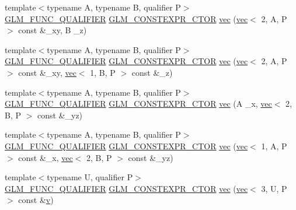 \begin{DoxyCompactItemize}
\item 
{\footnotesize template$<$typename A, typename B, qualifier P$>$ }\\\mbox{\hyperlink{setup_8hpp_a33fdea6f91c5f834105f7415e2a64407}{G\+L\+M\+\_\+\+F\+U\+N\+C\+\_\+\+Q\+U\+A\+L\+I\+F\+I\+ER}} \mbox{\hyperlink{setup_8hpp_ad34178a09666081abdb573c14d1f4a5a}{G\+L\+M\+\_\+\+C\+O\+N\+S\+T\+E\+X\+P\+R\+\_\+\+C\+T\+OR}} \mbox{\hyperlink{structglm_1_1vec_3_013_00_01_t_00_01_q_01_4_a611e956498c0d144b8ba94638e86fca9}{vec}} (\mbox{\hyperlink{structglm_1_1vec}{vec}}$<$ 2, A, P $>$ const \&\+\_\+xy, B \+\_\+z)
\item 
{\footnotesize template$<$typename A, typename B, qualifier P$>$ }\\\mbox{\hyperlink{setup_8hpp_a33fdea6f91c5f834105f7415e2a64407}{G\+L\+M\+\_\+\+F\+U\+N\+C\+\_\+\+Q\+U\+A\+L\+I\+F\+I\+ER}} \mbox{\hyperlink{setup_8hpp_ad34178a09666081abdb573c14d1f4a5a}{G\+L\+M\+\_\+\+C\+O\+N\+S\+T\+E\+X\+P\+R\+\_\+\+C\+T\+OR}} \mbox{\hyperlink{structglm_1_1vec_3_013_00_01_t_00_01_q_01_4_ae95dab82b1cb879409d72da36d6c6005}{vec}} (\mbox{\hyperlink{structglm_1_1vec}{vec}}$<$ 2, A, P $>$ const \&\+\_\+xy, \mbox{\hyperlink{structglm_1_1vec}{vec}}$<$ 1, B, P $>$ const \&\+\_\+z)
\item 
{\footnotesize template$<$typename A, typename B, qualifier P$>$ }\\\mbox{\hyperlink{setup_8hpp_a33fdea6f91c5f834105f7415e2a64407}{G\+L\+M\+\_\+\+F\+U\+N\+C\+\_\+\+Q\+U\+A\+L\+I\+F\+I\+ER}} \mbox{\hyperlink{setup_8hpp_ad34178a09666081abdb573c14d1f4a5a}{G\+L\+M\+\_\+\+C\+O\+N\+S\+T\+E\+X\+P\+R\+\_\+\+C\+T\+OR}} \mbox{\hyperlink{structglm_1_1vec_3_013_00_01_t_00_01_q_01_4_a901f1c696deb619cbd26555bc7b08513}{vec}} (A \+\_\+x, \mbox{\hyperlink{structglm_1_1vec}{vec}}$<$ 2, B, P $>$ const \&\+\_\+yz)
\item 
{\footnotesize template$<$typename A, typename B, qualifier P$>$ }\\\mbox{\hyperlink{setup_8hpp_a33fdea6f91c5f834105f7415e2a64407}{G\+L\+M\+\_\+\+F\+U\+N\+C\+\_\+\+Q\+U\+A\+L\+I\+F\+I\+ER}} \mbox{\hyperlink{setup_8hpp_ad34178a09666081abdb573c14d1f4a5a}{G\+L\+M\+\_\+\+C\+O\+N\+S\+T\+E\+X\+P\+R\+\_\+\+C\+T\+OR}} \mbox{\hyperlink{structglm_1_1vec_3_013_00_01_t_00_01_q_01_4_a1f6418de9fddeaf4b97c9743808b3496}{vec}} (\mbox{\hyperlink{structglm_1_1vec}{vec}}$<$ 1, A, P $>$ const \&\+\_\+x, \mbox{\hyperlink{structglm_1_1vec}{vec}}$<$ 2, B, P $>$ const \&\+\_\+yz)
\item 
{\footnotesize template$<$typename U, qualifier P$>$ }\\\mbox{\hyperlink{setup_8hpp_a33fdea6f91c5f834105f7415e2a64407}{G\+L\+M\+\_\+\+F\+U\+N\+C\+\_\+\+Q\+U\+A\+L\+I\+F\+I\+ER}} \mbox{\hyperlink{setup_8hpp_ad34178a09666081abdb573c14d1f4a5a}{G\+L\+M\+\_\+\+C\+O\+N\+S\+T\+E\+X\+P\+R\+\_\+\+C\+T\+OR}} \mbox{\hyperlink{structglm_1_1vec_3_013_00_01_t_00_01_q_01_4_a9f3cdc2f03db0bc50512e16a64cdb4aa}{vec}} (\mbox{\hyperlink{structglm_1_1vec}{vec}}$<$ 3, U, P $>$ const \&\mbox{\hyperlink{_s_d_l__opengl_8h_a10a82eabcb59d2fcd74acee063775f90}{v}})

\end{DoxyCompactItemize}
